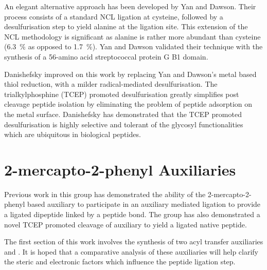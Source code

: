        An elegant alternative approach has been developed by Yan and Dawson. Their process consists of a standard NCL ligation at cysteine, followed by a desulfurisation step to yield alanine at the ligation site.\cite{yan_synthesis_2001} This extension of the NCL methodology is significant as alanine is rather more abundant than cysteine (\SI{6.3}{\percent} as opposed to \SI{1.7}{\percent}).\cite{shang_application} Yan and Dawson validated their technique with the synthesis of a 56-amino acid streptococcal protein G B1 domain.\cite{yan_synthesis_2001}


        Danishefsky improved on this work by replacing Yan and Dawson's metal based thiol reduction, with a milder radical-mediated desulfurisation.\cite{wan_free-radical-based_2007} The trialkylphosphine  (TCEP) promoted desulfurisation greatly simplifies post cleavage peptide isolation by eliminating the problem of peptide adsorption on the metal surface. Danishefsky has demonstrated that the TCEP promoted desulfurisation is highly selective and tolerant of the glycosyl functionalities which are ubiquitous in biological peptides.\cite{wan_free-radical-based_2007}

    \section{2-mercapto-2-phenyl Auxiliaries}


    Previous work in this group has demonstrated the ability of the 2-mercapto-2-phenyl based auxiliary  to participate in an auxiliary mediated ligation to provide a ligated dipeptide linked by a peptide bond. The group has also demonstrated a novel TCEP promoted cleavage of auxiliary   to yield a ligated native peptide.

    The first section of this work involves the synthesis of two acyl transfer auxiliaries  and . It is hoped that a comparative analysis of these auxiliaries will help clarify the steric and electronic factors which influence the peptide ligation step.

